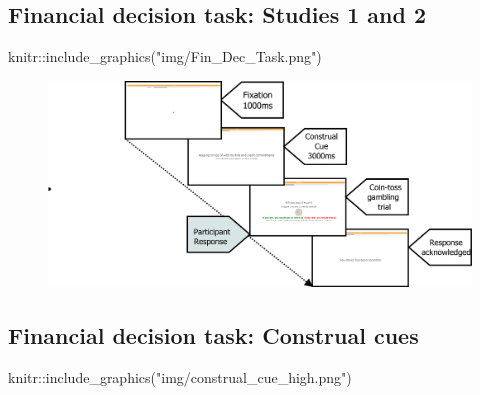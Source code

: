 \documentclass[
  letterpaper,
  DIV=11,
  numbers=noendperiod]{scrartcl}
\newenvironment{Shaded}{\begin{snugshade}}{\end{snugshade}}
\newcommand{\FunctionTok}[1]{\textcolor[rgb]{0.28,0.35,0.67}{#1}}
\newcommand{\NormalTok}[1]{\textcolor[rgb]{0.00,0.23,0.31}{#1}}
\newcommand{\SpecialCharTok}[1]{\textcolor[rgb]{0.37,0.37,0.37}{#1}}
\newcommand{\StringTok}[1]{\textcolor[rgb]{0.13,0.47,0.30}{#1}}
\begin{document}
\hypertarget{financial-decision-task-studies-1-and-2}{%
\subsection{Financial decision task: Studies 1 and
2}\label{financial-decision-task-studies-1-and-2}}

\begin{Shaded}
\begin{Highlighting}[]
\NormalTok{knitr}\SpecialCharTok{::}\FunctionTok{include\_graphics}\NormalTok{(}\StringTok{"img/Fin\_Dec\_Task.png"}\NormalTok{)}
\end{Highlighting}
\end{Shaded}

\begin{figure}[H]

{\centering \includegraphics[width=2\textwidth,height=\textheight]{img/Fin_Dec_Task.png}

}

\end{figure}

\hypertarget{financial-decision-task-construal-cues}{%
\subsection{Financial decision task: Construal
cues}\label{financial-decision-task-construal-cues}}

\begin{Shaded}
\begin{Highlighting}[]
\NormalTok{knitr}\SpecialCharTok{::}\FunctionTok{include\_graphics}\NormalTok{(}\StringTok{"img/construal\_cue\_high.png"}\NormalTok{)}
\end{Highlighting}
\end{Shaded}
\end{document}
